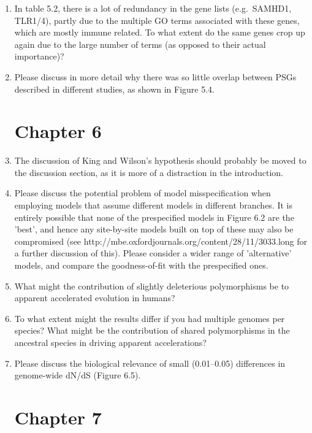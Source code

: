\begin{enumerate}
\item{ In table 5.2, there is a lot of redundancy in the gene lists
(e.g.\ SAMHD1, TLR1/4), partly due to the multiple GO terms associated
with these genes, which are mostly immune related. To what extent do
the same genes crop up again due to the large number of terms (as
opposed to their actual importance)?}

\item{ Please discuss in more detail why there was so little overlap between
PSGs described in different studies, as shown in Figure 5.4.}

\section{Chapter 6}

\item{ The discussion of King and Wilson's hypothesis should probably be
moved to the discussion section, as it is more of a distraction in the
introduction.}

\item{ Please discuss the potential problem of model misspecification when
employing models that assume different models in different
branches. It is entirely possible that none of the prespecified models
in Figure 6.2 are the 'best', and hence any site-by-site models built
on top of these may also be compromised (see
http://mbe.oxfordjournals.org/content/28/11/3033.long for a further
discussion of this). Please consider a wider range of 'alternative'
models, and compare the goodness-of-fit with the prespecified ones.}

\item{ What might the contribution of slightly deleterious polymorphisms be
to apparent accelerated evolution in humans?}

\item{ To what extent might the results differ if you had multiple genomes
per species? What might be the contribution of shared polymorphisms in
the ancestral species in driving apparent accelerations?}

\item{ Please discuss the biological relevance of small (0.01--0.05)
differences in genome-wide dN/dS (Figure 6.5).}

\section{Chapter 7}


\end{enumerate}
